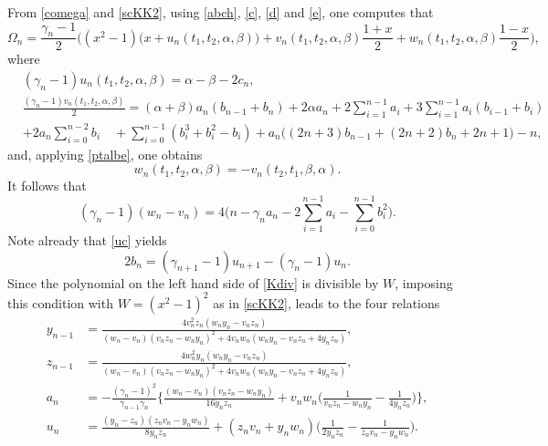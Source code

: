 \documentclass[10pt, reqno]{amsart}
\numberwithin{equation}{section}
\numberwithin{equation}{section}
\begin{document}
From \eqref{comega} and \eqref{scKK2}, using \eqref{abch}, \eqref{c}, \eqref{d} and \eqref{e}, one computes that
\begin{equation}
\Omega_n=\frac{\gamma_n-1}{2}\Big((x^2-1)\big(x+u_n(t_1,t_2,\alpha,\beta)\big)+v_n(t_1,t_2,\alpha,\beta)\frac{1+x}{2}+w_n(t_1,t_2,\alpha,\beta)\frac{1-x}{2}\Big),\label{Komega}
\end{equation}
where
\begin{align} 
&(\gamma_n-1)u_n(t_1,t_2,\alpha,\beta)=\alpha-\beta-2c_n,\label{uc}\\
&\frac{(\gamma_{n}-1)v_n(t_1,t_2,\alpha,\beta)}{2}=(\alpha+\beta)a_n(b_{n-1}+b_n)+2\alpha a_n+2\sum_{i=1}^{n-1}a_i+3\sum_{i=1}^{n-1}a_i(b_{i-1}+b_i)\nonumber\\
&+2a_n\sum_{i=0}^{n-2}b_i
\quad+\sum_{i=0}^{n-1}(b_i^3+b_i^2-b_i)+a_n\big((2n+3)b_{n-1}+(2n+2)b_n+2n+1)-n,\label{Kvab}
\end{align}
and, applying \eqref{ptalbe}, one obtains
\begin{equation}
w_n(t_1,t_2,\alpha,\beta)=-v_n(t_2,t_1, \beta,\alpha).\label{uva}
\end{equation}
It follows that 
\begin{equation}
(\gamma_n-1)(w_n-v_n)=4\Big(n-\gamma_na_n-2\sum_{i=1}^{n-1}a_i-\sum_{i=0}^{n-1}b_i^2\Big).\label{Kwmv}
\end{equation}
Note already that \eqref{uc} yields 
\begin{equation}
2b_n=(\gamma_{n+1}-1)u_{n+1}-(\gamma_n-1)u_n.\label{Krb}
\end{equation}
Since the polynomial on the left hand side of \eqref{Kdiv} is divisible by $W$, imposing this condition with $W=(x^2-1)^2$ as in \eqref{scKK2}, leads to the four relations
\begin{align}
y_{n-1}&=\frac{4v_n^2z_n(w_ny_n-v_nz_n)}{(w_n-v_n)(v_nz_n-w_ny_n)^2+4v_nw_n(w_ny_n-v_nz_n+4y_nz_n)},\label{Krym1}\\
z_{n-1}&=\frac{4w_n^2y_n(w_ny_n-v_nz_n)}{(w_n-v_n)(v_nz_n-w_ny_n)^2+4v_nw_n(w_ny_n-v_nz_n+4y_nz_n)},\label{Krzm1}\\
a_n&=-\frac{(\gamma_n-1)^2}{\gamma_{n-1}\gamma_n}\Bigg\{\frac{(w_n-v_n)(v_nz_n-w_ny_n)}{16y_nz_n}
+v_nw_n\Big(\frac{1}{v_nz_n-w_ny_n}-\frac{1}{4y_nz_n}\Big)\Bigg\},\label{Kra}\\
u_n&=\frac{(y_n-z_n)(z_nv_n-y_nw_n)}{8y_nz_n}
+(z_nv_n+y_nw_n)\Bigg(\frac{1}{2y_nz_n}-\frac{1}{z_nv_n-y_nw_n}\Bigg)\label{Kru}.
\end{align}
\end{document}
